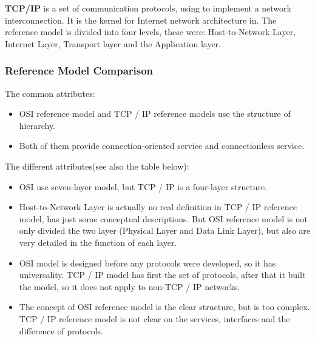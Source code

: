 \textbf{TCP/IP} is a set of communication protocols, using to implement a network interconnection. It is the kernel for Internet network architecture in\cite{rfc1213}. The reference model is divided into four levels, these were: Host-to-Network Layer, Internet Layer, Transport layer and the Application layer.  

\subsubsection{Reference Model Comparison}

The common attributes:

\begin{itemize}
	\item OSI reference model and TCP / IP reference models use the structure of hierarchy.  
	\item Both of them provide connection-oriented service and connectionless service.  
\end{itemize}

The different attributes(see also the table below): 

\begin{itemize}
	\item OSI use seven-layer model, but TCP / IP is a four-layer structure.  
	\item Host-to-Network Layer is actually no real definition in TCP / IP reference model, has just some conceptual descriptions. But OSI reference model is not only divided the two layer (Physical Layer and Data Link Layer), but also are very detailed in the function of each layer.  
	\item OSI model is designed before any protocols were developed, so it has universality. TCP / IP model has first the set of protocols, after that it built the model, so it does not apply to non-TCP / IP networks.  
	\item The concept of OSI reference model is the clear structure, but is too complex. TCP / IP reference model is not clear on the services, interfaces and the difference of protocols. 
\end{itemize}

